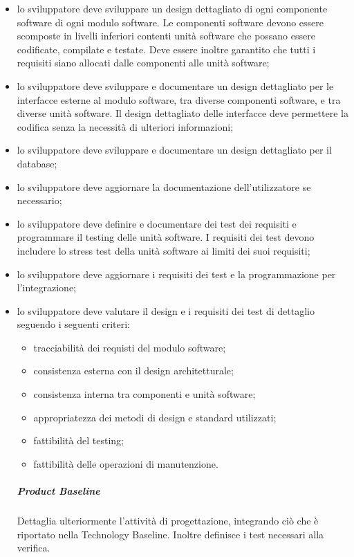 			\begin{itemize}
			\item lo sviluppatore deve sviluppare un design dettagliato di ogni componente software di ogni modulo software. Le componenti software devono essere scomposte in livelli inferiori contenti unità software che possano essere codificate, compilate e testate. Deve essere inoltre garantito che tutti i requisiti siano allocati dalle componenti alle unità software;
			\item lo sviluppatore deve sviluppare e documentare un design dettagliato per le interfacce esterne al modulo software, tra diverse componenti software, e tra diverse unità software. Il design dettagliato delle interfacce deve permettere la codifica senza la necessità di ulteriori informazioni;
			\item lo sviluppatore deve sviluppare e documentare un design dettagliato per il database;
			\item lo sviluppatore deve aggiornare la documentazione dell'utilizzatore se necessario;
			\item lo sviluppatore deve definire e documentare dei test dei requisiti e programmare il testing delle unità software. I requisiti dei test devono includere lo stress test della unità software ai limiti dei suoi requisiti;
			\item lo sviluppatore deve aggiornare i requisiti dei test e la programmazione per l'integrazione;
			\item lo sviluppatore deve valutare il design e i requisiti dei test di dettaglio seguendo i seguenti criteri:
			\begin{itemize}
			\item tracciabilità dei requisti del modulo software;
			\item consistenza esterna con il design architetturale;
			\item consistenza interna tra componenti e unità software;
			\item appropriatezza dei metodi di design e standard utilizzati;
			\item fattibilità del testing;
			\item fattibilità delle operazioni di manutenzione.
			\end{itemize}
			\subparagraph{Product Baseline} Dettaglia ulteriormente l'attività di progettazione, integrando ciò che è riportato nella Technology Baseline\glo. Inoltre definisce i test necessari alla verifica.\newline \newline

\end{itemize}
